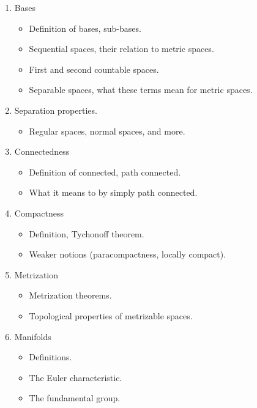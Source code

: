 \documentclass{article}
\begin{document}
\begin{enumerate}
\begin{itemize}
            \end{itemize}
        \item Bases
            \begin{itemize}
                \item Definition of bases, sub-bases.
                \item Sequential spaces, their relation to metric spaces.
                \item First and second countable spaces.
                \item Separable spaces, what these terms mean for metric spaces.
            \end{itemize}
        \item Separation properties.
            \begin{itemize}
                \item Regular spaces, normal spaces, and more.
            \end{itemize}
        \item Connectedness
            \begin{itemize}
                \item Definition of connected, path connected.
                \item What it means to by simply path connected.
            \end{itemize}
        \item Compactness
            \begin{itemize}
                \item Definition, Tychonoff theorem.
                \item Weaker notions (paracompactness, locally compact).
            \end{itemize}
        \item Metrization
            \begin{itemize}
                \item Metrization theorems.
                \item Topological properties of metrizable spaces.
            \end{itemize}
        \item Manifolds
            \begin{itemize}
                \item Definitions.
                \item The Euler characteristic.
                \item The fundamental group.
            \end{itemize}
    \end{enumerate}
\end{document}
